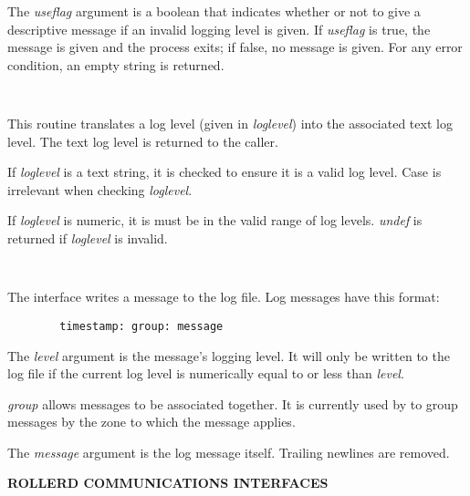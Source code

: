 \begin{description}
The {\it useflag} argument is a boolean that indicates whether or not to give
a descriptive message if an invalid logging level is given.  If {\it useflag}
is true, the message is given and the process exits; if false, no message is
given.  For any error condition, an empty string is returned.

\item {}\verb" "

This routine translates a log level (given in {\it loglevel}) into the
associated text log level.  The text log level is returned to the caller.

If {\it loglevel} is a text string, it is checked to ensure it is a valid log
level.  Case is irrelevant when checking {\it loglevel}.

If {\it loglevel} is numeric, it is must be in the valid range of log levels.
{\it undef} is returned if {\it loglevel} is invalid.

\item {}\verb" "

The  interface writes a message to the log file.  Log
messages have this format:

\begin{verbatim}        timestamp: group: message\end{verbatim}

The {\it level} argument is the message's logging level.  It will only be
written to the log file if the current log level is numerically equal to or
less than {\it level}.

{\it group} allows messages to be associated together.  It is currently used
by  to group messages by the zone to which the message applies.

The {\it message} argument is the log message itself.  Trailing newlines are
removed.

\end{description}

{\bf ROLLERD COMMUNICATIONS INTERFACES}

